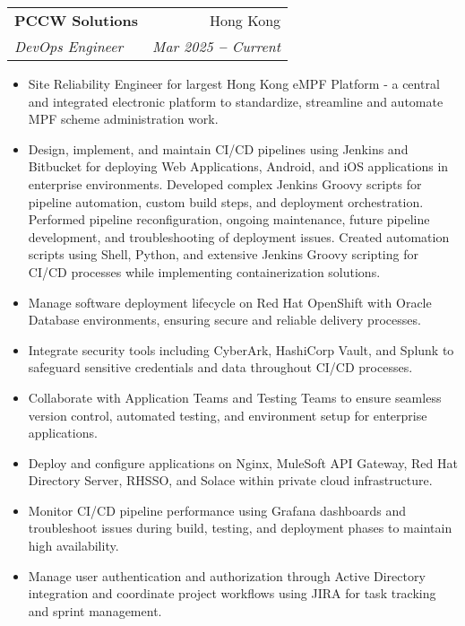 \documentclass[letterpaper,11pt]{article}
\makeatletter
\newcommand{\resumeItem}[1]{
  \item\small{
    {#1 \vspace{-2pt}}
  }
}
\newcommand{\resumeSubheading}[4]{
  \vspace{-2pt}\item
    \begin{tabular*}{0.97\textwidth}[t]{l@{\extracolsep{\fill}}r}
      \textbf{#1} & #2 \\
      \textit{\small#3} & \textit{\small #4} \\
    \end{tabular*}\vspace{-7pt}
}
\newcommand{\resumeItemListStart}{\begin{itemize}}
\newcommand{\resumeItemListEnd}{\end{itemize}\vspace{-5pt}}
\makeatother
\begin{document}
    \resumeSubheading
      {PCCW Solutions}{Hong Kong}
      {DevOps Engineer}{Mar 2025 \textbf{--} Current}
        \resumeItemListStart
            \resumeItem{Site Reliability Engineer for largest Hong Kong eMPF Platform - a central and integrated electronic platform to standardize, streamline and automate MPF scheme administration work.}
            \resumeItem{Design, implement, and maintain CI/CD pipelines using Jenkins and Bitbucket for deploying Web Applications, Android, and iOS applications in enterprise environments. Developed complex Jenkins Groovy scripts for pipeline automation, custom build steps, and deployment orchestration. Performed pipeline reconfiguration, ongoing maintenance, future pipeline development, and troubleshooting of deployment issues. Created automation scripts using Shell, Python, and extensive Jenkins Groovy scripting for CI/CD processes while implementing containerization solutions.}
            \resumeItem{Manage software deployment lifecycle on Red Hat OpenShift with Oracle Database environments, ensuring secure and reliable delivery processes.}
            \resumeItem{Integrate security tools including CyberArk, HashiCorp Vault, and Splunk to safeguard sensitive credentials and data throughout CI/CD processes.}
            \resumeItem{Collaborate with Application Teams and Testing Teams to ensure seamless version control, automated testing, and environment setup for enterprise applications.}
            \resumeItem{Deploy and configure applications on Nginx, MuleSoft API Gateway, Red Hat Directory Server, RHSSO, and Solace within private cloud infrastructure.}
            \resumeItem{Monitor CI/CD pipeline performance using Grafana dashboards and troubleshoot issues during build, testing, and deployment phases to maintain high availability.}
            \resumeItem{Manage user authentication and authorization through Active Directory integration and coordinate project workflows using JIRA for task tracking and sprint management.}
        \resumeItemListEnd
\end{document}
